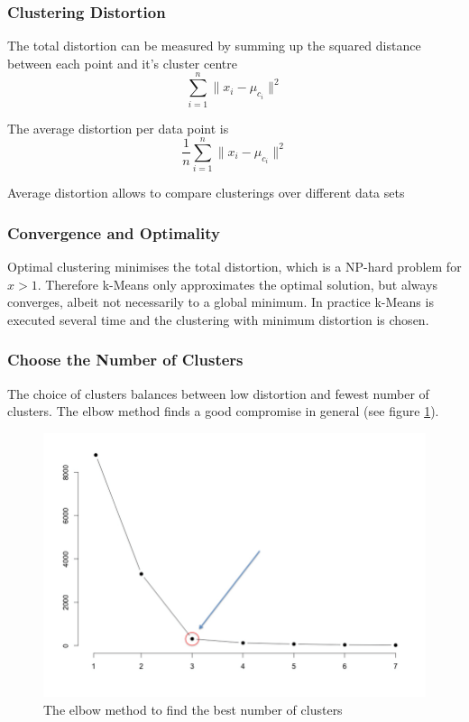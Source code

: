 \documentclass[11pt]{article}
\begin{document}
\subsubsection{Clustering Distortion}

The total distortion can be measured by summing up the squared distance between each point and it's cluster centre
\begin{equation}
    \sum_{i=1}^{n}\| x_i -\mu_{c_i} \|^2
\end{equation}

The average distortion per data point is
\begin{equation}
    \frac{1}{n}\sum_{i=1}^{n}\| x_i -\mu_{c_i} \|^2
\end{equation}

Average distortion allows to compare clusterings over different data sets

\subsubsection{Convergence and Optimality}

Optimal clustering minimises the total distortion, which is a NP-hard problem for $x>1$. Therefore k-Means only approximates the optimal solution, but always converges, albeit not necessarily to a global minimum. In practice k-Means is executed several time and the clustering with minimum distortion is chosen.

\subsubsection{Choose the Number of Clusters}

The choice of clusters balances between low distortion and fewest number of clusters. The elbow method finds a good compromise in general (see figure \ref{fig:elbowmethod}).

\begin{figure}[htb!]
    \centering
    \includegraphics[keepaspectratio, width=0.4\linewidth]{Pictures/elbow_method}
    \caption{The elbow method to find the best number of clusters}
    \label{fig:elbowmethod}
\end{figure}
\end{document}
